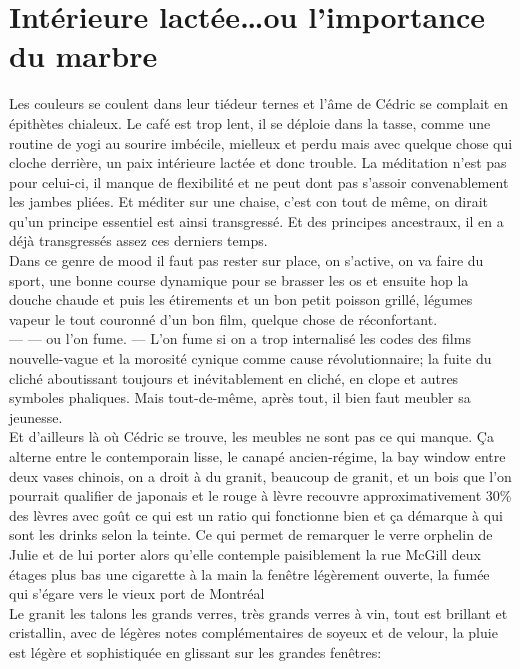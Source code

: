 

\section*{Intérieure lactée\ldots ou l'importance du marbre}
Les couleurs se
coulent dans leur tiédeur ternes et l'âme de Cédric se complait en épithètes
chialeux. Le café est trop lent, il se déploie dans la tasse, comme une routine
de yogi au sourire imbécile, mielleux et perdu mais avec quelque chose qui
cloche derrière, un paix intérieure lactée et donc trouble. La méditation n'est
pas pour celui-ci, il manque de flexibilité et ne peut dont pas s'assoir
convenablement les jambes pliées.  Et méditer sur une chaise, c'est con tout de
même, on dirait qu'un principe essentiel est ainsi transgressé. Et des principes
ancestraux, il en a déjà transgressés assez ces derniers temps.\\

Dans ce genre de mood il faut pas rester sur place, on s'active, on va faire du
sport, une bonne course dynamique pour se brasser les os et ensuite hop
la douche chaude et puis les étirements et un bon petit poisson grillé, légumes
vapeur le tout couronné d'un bon film, quelque chose de réconfortant.
\\--- --- ou l'on fume. --- L'on
fume si on a trop internalisé les codes des films nouvelle-vague et la morosité
cynique comme cause révolutionnaire; la fuite du cliché
aboutissant toujours et inévitablement en cliché, en  clope et autres symboles
phaliques.  Mais tout-de-même, après tout, il bien faut
meubler sa jeunesse. \\

Et d'ailleurs là où Cédric se trouve, les meubles ne sont
pas ce qui manque.  Ça alterne entre le contemporain lisse, le canapé
ancien-régime, la bay window entre deux vases chinois, on a droit à du granit,
beaucoup de granit, et un bois que l'on pourrait qualifier de japonais
et le rouge à lèvre recouvre approximativement
30\% des lèvres avec goût ce qui est un ratio qui fonctionne bien 
et ça démarque à qui sont les drinks selon la teinte.
Ce qui permet de remarquer le verre orphelin de Julie et de lui porter 
alors qu'elle contemple paisiblement la rue McGill deux étages plus
bas une cigarette à la main la fenêtre légèrement ouverte, la fumée qui 
s'égare vers le vieux port de Montréal 
\\Le granit les talons les grands verres,
très grands verres à vin, tout est brillant et cristallin, avec de légères
notes complémentaires de soyeux et de velour, la pluie est légère et sophistiquée
en glissant sur les grandes fenêtres:

